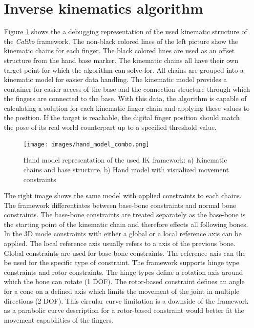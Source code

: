 \section{Inverse kinematics algorithm}
Figure \ref{img:hand-constraint_debug_view} shows the a debugging representation of the used kinematic structure of the \textit{Caliko} framework. The non-black colored lines of the left picture show the kinematic chains for each finger. The black colored lines are used as an offset structure from the hand base marker.
The kinematic chains all have their own target point for which the algorithm can solve for. All chains are grouped into a kinematic model for easier data handling. The kinematic model provides a container for easier access of the base and the connection structure through which the fingers are connected to the base.
With this data, the algorithm is capable of calculating a solution for each kinematic finger chain and applying these values to the position. If the target is reachable, the digital finger position should match the pose of its real world counterpart up to a specified threshold value.
\begin{figure}[H]
\centering
\texttt{[image: images/hand\_model\_combo.png]}
\caption{Hand model representation of the used IK framework: a) Kinematic chains and base structure, b) Hand model with visualized movement constraints}
\label{img:hand-constraint_debug_view} 
\end{figure}
The right image shows the same model with applied constraints to each chains. The framework differentiates between base-bone constraints and normal bone constraints. The base-bone constraints are treated separately as the base-bone is the starting point of the kinematic chain and therefore effects all following bones. In the 3D mode constraints with either a global or a local reference axis can be applied. The local reference axis usually refers to a axis of the previous bone. Global constraints are used for base-bone constraints. The reference axis can the be used for the specific type of constraint. The framework supports hinge type constraints and rotor constraints. The hinge types define a rotation axis around which the bone can rotate (1 DOF). The rotor-based constraint defines an angle for a cone on a defined axis which limits the movement of the joint in multiple directions (2 DOF). This circular curve limitation is a downside of the framework as a parabolic curve description for a rotor-based constraint would better fit the movement capabilities of the fingers.
\newpage 
